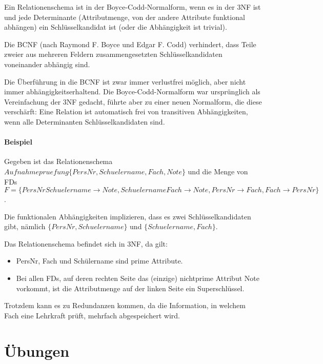\documentclass{lehramt-informatik-haupt}
\begin{document}
Ein Relationenschema ist in der Boyce-Codd-Normalform, wenn es in der
3NF ist und jede Determinante (Attributmenge, von der andere Attribute
funktional abhängen) ein Schlüsselkandidat ist (oder die Abhängigkeit
ist trivial).

Die BCNF (nach Raymond F. Boyce und Edgar F. Codd) verhindert, dass
Teile zweier aus mehreren Feldern zusammengesetzten Schlüsselkandidaten
voneinander abhängig sind.

Die Überführung in die BCNF ist zwar immer verlustfrei möglich, aber
nicht immer abhängigkeitserhaltend. Die Boyce-Codd-Normalform war
ursprünglich als Vereinfachung der 3NF gedacht, führte aber zu einer
neuen Normalform, die diese verschärft: Eine Relation ist automatisch
frei von transitiven Abhängigkeiten, wenn alle Determinanten
Schlüsselkandidaten sind.

\subsubsection{Beispiel}

Gegeben ist das Relationenschema
$Aufnahmepruefung\{PersNr, Schuelername, Fach, Note\}$
und die Menge von FDs
$F = \{
  PersNr Schuelername \rightarrow Note,
  Schuelername Fach \rightarrow Note,
  PersNr \rightarrow Fach,
  Fach \rightarrow PersNr
\}$.

Die funktionalen Abhängigkeiten implizieren, dass es zwei
Schlüsselkandidaten gibt, nämlich
$\{PersNr, Schuelername\}$ und
$\{Schuelername, Fach\}$.

Das Relationenschema befindet sich in 3NF, da gilt:

\begin{itemize}
\item PersNr, Fach und Schülername sind prime Attribute.

\item Bei allen FDs, auf deren rechten Seite das (einzige) nichtprime
Attribut Note vorkommt, ist die Attributmenge auf der linken Seite ein
Superschlüssel.
\end{itemize}

Trotzdem kann es zu Redundanzen kommen, da die Information, in welchem
Fach eine Lehrkraft prüft, mehrfach abgespeichert wird.

%

\chapter{Übungen}
\end{document}
